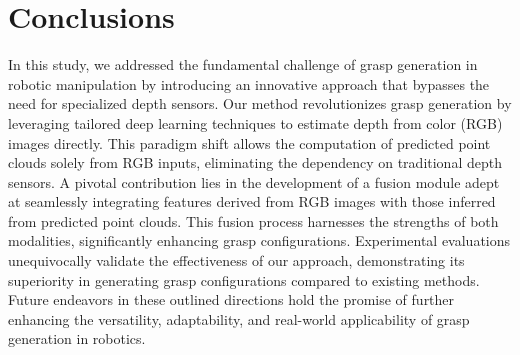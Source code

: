 \section{Conclusions}

In this study, we addressed the fundamental challenge of grasp generation in robotic manipulation by introducing an innovative approach that bypasses the need for specialized depth sensors. Our method revolutionizes grasp generation by leveraging tailored deep learning techniques to estimate depth from color (RGB) images directly. This paradigm shift allows the computation of predicted point clouds solely from RGB inputs, eliminating the dependency on traditional depth sensors. A pivotal contribution lies in the development of a fusion module adept at seamlessly integrating features derived from RGB images with those inferred from predicted point clouds. This fusion process harnesses the strengths of both modalities, significantly enhancing grasp configurations. Experimental evaluations unequivocally validate the effectiveness of our approach, demonstrating its superiority in generating grasp configurations compared to existing methods. Future endeavors in these outlined directions hold the promise of further enhancing the versatility, adaptability, and real-world applicability of grasp generation in robotics.